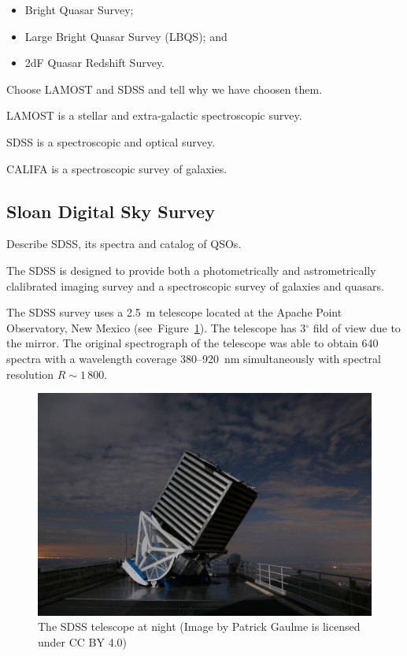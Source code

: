 \begin{itemize}
	\item Bright Quasar Survey;
	\item Large Bright Quasar Survey (LBQS); and
	\item 2dF Quasar Redshift Survey.
\end{itemize}

Choose LAMOST and SDSS and tell why we have choosen them.

LAMOST is a stellar and extra-galactic spectroscopic survey.

SDSS is a spectroscopic and optical survey.

CALIFA is a spectroscopic survey of galaxies.

\subsection{Sloan Digital Sky Survey}
\label{sdss}

Describe SDSS, its spectra and catalog of QSOs.

The SDSS is designed to provide both a photometrically and astrometrically clalibrated imaging survey
and a spectroscopic survey of galaxies and quasars.~\cite{york2000}

The SDSS survey uses a 2.5~m telescope located at the Apache Point Observatory, New Mexico (see~Figure~\ref{sdss_telescope}).
The telescope has 3\(^{\circ}\) fild of view due to the mirror.
The original spectrograph of the telescope was able to obtain 640 spectra
with a wavelength coverage 380--920~nm simultaneously
with spectral resolution \(R \sim 1\,800\).~\cite{gunn1998, york2000}

\begin{figure}
	\includegraphics[width=\textwidth]{img/sdss_gaulme.jpg}
	\caption{The SDSS telescope at night (Image by Patrick Gaulme is licensed under CC BY 4.0)}
	\label{sdss_telescope}
\end{figure}

